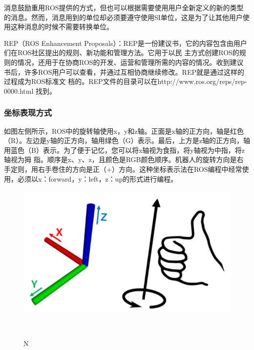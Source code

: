 \documentclass[geye,green,kindle,cn]{elegantnote}
\begin{document}
消息鼓励重用ROS提供的方式，但也可以根据需要使用用户全新定义的新的类型的消息。然而，消息用到的单位却必须要遵守使用SI单位，这是为了让其他用户使用这种消息的时候不需要转换单位。

REP（ROS Enhancement Proposals）：REP是一份建议书，它的内容包含由用户们在ROS社区提出的规则、新功能和管理方法。它用于以民 主方式创建ROS的规则的情况，还用于在协商ROS的开发、运营和管理所需的内容的情况。收到建议 书后，许多ROS用户可以查看，并通过互相协商继续修改。REP就是通过这样的过程成为ROS标准文 档的。REP文件的目录可以在http://www.ros.org/reps/rep-0000.html 找到。
\subsubsection{坐标表现方式}
如图左侧所示，ROS中的旋转轴使用x，y和z轴。正面是x轴的正方向，轴是红色（R）。左边是y轴的正方向，轴用绿色（G）表示。最后，上方是z轴的正方向，轴用蓝色（B）表示。为了便于记忆，您可以将x轴视为食指，将y轴视为中指，将z轴视为拇 指。顺序是x、y、z，且颜色是RGB颜色顺序。机器人的旋转方向是右手定则，用右手卷住的方向是正（+）方向。这种坐标表示法在ROS编程中经常使用，必须以x：forward，y：left，z：up的形式进行编程。
\begin{figure}[htbp]
    \centering
    \includegraphics[width=1\linewidth]{src/N.png}
    \centering
    \caption{N} \label{picture:N}
\end{figure}
\end{document}
